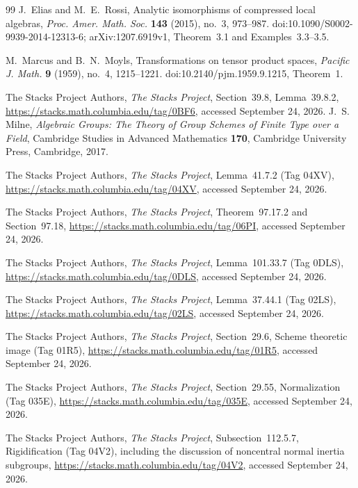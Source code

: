 \documentclass[11pt,reqno]{amsart}
\numberwithin{equation}{section}
\theoremstyle{definition}\newtheorem{definition}[theorem]{Definition}
\theoremstyle{remark}\newtheorem{remark}[theorem]{Remark}
\begin{document}
\begin{thebibliography}{99}
J.~Elias and M.~E.~Rossi,
Analytic isomorphisms of compressed local algebras,
\emph{Proc. Amer. Math. Soc.} \textbf{143} (2015), no.~3, 973--987.
doi:10.1090/S0002-9939-2014-12313-6;
arXiv:1207.6919v1, Theorem~3.1 and Examples~3.3--3.5.

M.~Marcus and B.~N.~Moyls,
Transformations on tensor product spaces,
\emph{Pacific J. Math.} \textbf{9} (1959), no.~4, 1215--1221.
doi:10.2140/pjm.1959.9.1215, Theorem~1.

The Stacks Project Authors,
\emph{The Stacks Project}, Section~39.8, Lemma~39.8.2,
\url{https://stacks.math.columbia.edu/tag/0BF6}, accessed September 24, 2026.
J.~S. Milne, \emph{Algebraic Groups: The Theory of Group Schemes of
Finite Type over a Field}, Cambridge Studies in Advanced Mathematics
\textbf{170}, Cambridge University Press, Cambridge, 2017.

The Stacks Project Authors, \emph{The Stacks Project},
Lemma~41.7.2 (Tag 04XV),
\url{https://stacks.math.columbia.edu/tag/04XV}, accessed September 24, 2026.

The Stacks Project Authors, \emph{The Stacks Project},
Theorem~97.17.2 and Section~97.18,
\url{https://stacks.math.columbia.edu/tag/06PI}, accessed September 24, 2026.

The Stacks Project Authors, \emph{The Stacks Project},
Lemma~101.33.7 (Tag 0DLS),
\url{https://stacks.math.columbia.edu/tag/0DLS}, accessed September 24, 2026.

The Stacks Project Authors, \emph{The Stacks Project},
Lemma~37.44.1 (Tag 02LS),
\url{https://stacks.math.columbia.edu/tag/02LS}, accessed September 24, 2026.

The Stacks Project Authors, \emph{The Stacks Project},
Section~29.6, Scheme theoretic image (Tag 01R5),
\url{https://stacks.math.columbia.edu/tag/01R5}, accessed September 24, 2026.

The Stacks Project Authors, \emph{The Stacks Project},
Section~29.55, Normalization (Tag 035E),
\url{https://stacks.math.columbia.edu/tag/035E}, accessed September 24, 2026.

The Stacks Project Authors, \emph{The Stacks Project},
Subsection~112.5.7, Rigidification (Tag 04V2), including the discussion
of noncentral normal inertia subgroups,
\url{https://stacks.math.columbia.edu/tag/04V2}, accessed September 24, 2026.



\end{thebibliography}
\end{document}
